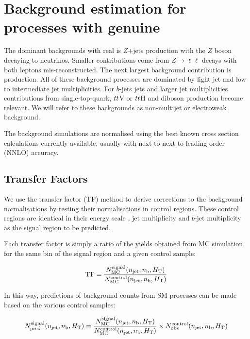 
\section{Background estimation for processes with genuine \met}

The dominant backgrounds with real \met is $Z$+jets production with the $Z$ boson decaying to neutrinos.
Smaller contributions come from $Z\to \ell \ell$ decays with both leptons
mis-reconstructed. The next largest background contribution is \wtaunu production. All of these background processes are dominated
by light jet and low to intermediate jet multiplicities. For $b$-jets jets and larger jet 
multiplicities contributions from single-top-quark, $t\bar{t}$V or $t\bar{t}$H and diboson production become relevant. We will refer
to these backgrounds as non-multijet or electroweak background.

The background simulations are normalised using the best known cross
section calculations currently available, usually with next-to-next-to-leading-order (NNLO) accuracy. 

\subsection{Transfer Factors}
\label{sec:ewk-method}

We use the transfer factor (TF) method to derive corrections to the background normalisations by testing their normalisations
in control regions. These control regions are identical in their energy scale \scalht, jet multiplicity \njet and $b$-jet multiplicity \nb 
as the signal region to be predicted. 

Each transfer factor is simply a ratio of the yields obtained from MC
simulation for the same bin of the signal region and a given control
sample:

\begin{equation}
  \label{equ:tf-ratio}
  {\rm TF} = \frac{N_{\rm MC}^{\rm signal}(n_{\text{jet}},n_{\text{b}},\mbox{$H_\text{T}$})}{N_{\rm
      MC}^{\rm control}(n_{\text{jet}},n_{\text{b}},\mbox{$H_\text{T}$})} 
\end{equation}

In this way, predictions of background counts from SM processes can be
made based on the various control samples:

\begin{equation}
  \label{equ:pred-method}
  N_{\textrm{pred}}^{\rm signal}(n_{\text{jet}},n_{\text{b}},\mbox{$H_\text{T}$}) = \frac{N_{\rm MC}^{\rm
      signal}(n_{\text{jet}},n_{\text{b}},\mbox{$H_\text{T}$})}{N_{\rm MC}^{\rm
      control}(n_{\text{jet}},n_{\text{b}},\mbox{$H_\text{T}$})} \times N_{\textrm{obs}}^{\rm
    control}(n_{\text{jet}},n_{\text{b}},\mbox{$H_\text{T}$})   
\end{equation}


